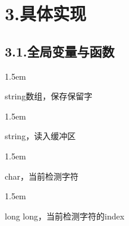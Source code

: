\documentclass{article}
\begin{document}
\section{3.\hspace*{0.5em}具体实现}\label{section}%

\subsection{3.1.\hspace*{0.5em}全局变量与函数}\label{section}%

\begin{mddefinitions}%


\begin{mdbmarginx}{}{}{}{1.5em}%
\begin{mddefdata}%
string数组，保存保留字
\end{mddefdata}%
\end{mdbmarginx}%


\begin{mdbmarginx}{}{}{}{1.5em}%
\begin{mddefdata}%
string，读入缓冲区
\end{mddefdata}%
\end{mdbmarginx}%


\begin{mdbmarginx}{}{}{}{1.5em}%
\begin{mddefdata}%
char，当前检测字符
\end{mddefdata}%
\end{mdbmarginx}%


\begin{mdbmarginx}{}{}{}{1.5em}%
\begin{mddefdata}%
long long，当前检测字符的index
\end{mddefdata}%
\end{mdbmarginx}%



\end{mddefinitions}
\end{document}
